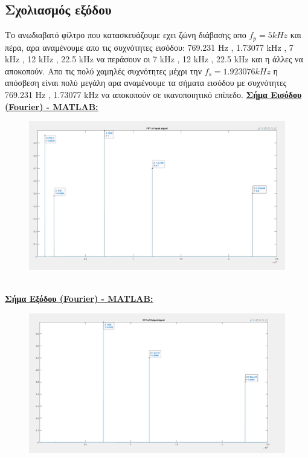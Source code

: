 \documentclass{article}
\begin{document}
{{{\subsection*{Σχολιασμός εξόδου}
Το ανωδιαβατό φίλτρο που κατασκευάζουμε εχει ζώνη διάβασης απο $f_p = 5 kHz$ και πέρα, αρα αναμένουμε απο τις συχνότητες εισόδου:  769.231 Hz , 1.73077 kHz , 7 kHz , 12 kHz , 22.5 kHz να περάσουν οι 7 kHz , 12 kHz , 22.5 kHz και η άλλες να αποκοπούν. 
Απο τις πολύ χαμηλές συχνότητες μέχρι την $f_s=1.923076kHz$ η απόσβεση είναι πολύ μεγάλη αρα αναμένουμε τα σήματα εισόδου με συχνότητες 769.231 Hz , 1.73077 kHz να αποκοπούν σε ικανοποιητικό επίπεδο.
\clearpage
\textbf{\underline{Σήμα Εισόδου (Fourier) - MATLAB:}}
\begin{figure}[h!]
\centering
 	\advance\leftskip-0.5cm
  \includegraphics[width=130mm,scale=2]{thema4/mat1.jpg}
\end{figure} \\[1.4\baselineskip]
\textbf{\underline{Σήμα Εξόδου (Fourier) - MATLAB:}}
\begin{figure}[h!]
\centering
 	\advance\leftskip-0.5cm
  \includegraphics[width=130mm,scale=2]{thema4/mat2.jpg}
\end{figure} \\
}}}
\end{document}
